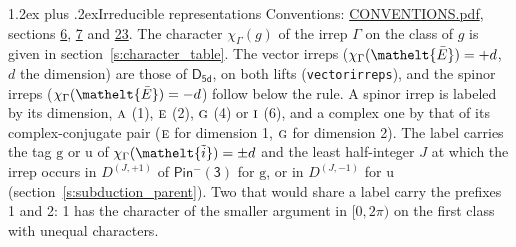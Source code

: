 \documentclass[10pt,a4paper]{article}
\makeatletter
\renewcommand\section{\@startsection{section}{1}{\z@}{-3ex plus -1ex minus -.2ex}%
  {1.2ex plus .2ex}{\normalfont\large\sffamily\bfseries\color{parttitle}}}
\numberwithin{equation}{section}
\newcommand{\eltfont}[1]{{\let\sigma\eltsigma\mathelt{#1}}}
\newcommand{\grp}[1]{\mathsf{#1}}
\newcommand{\irr}[1]{\text{\normalfont\scshape #1}}
\newcommand{\elt}[1]{\eltfont{#1}}
\newcommand{\ptag}[1]{\mathrm{#1}}
\newcommand{\irrJp}[2]{D^{(#1,#2)}}
\newcommand{\irchar}[1]{\chi_{#1}}
\newcommand{\barred}[1]{\bar{#1}}
\newcommand{\lift}[1]{\tilde{#1}}
\makeatother
\begin{document}
\section{Irreducible representations}\label{s:irreps}
Conventions: \href{../../CONVENTIONS.pdf}{CONVENTIONS.pdf}, sections \href{../../../rotation/CONVENTIONS.pdf\#conv.6}{6}, \href{../../../rotation/CONVENTIONS.pdf\#conv.7}{7} and \href{../../CONVENTIONS.pdf\#conv.23}{23}.
\leavevmode\label{n:function.character}\label{n:irrep.Gamma}The character $\irchar{\Gamma}(g)$ of the irrep $\Gamma$ on the class of $g$ is given in section~\ref{s:character_table}. \label{n:index.dimension}The vector irreps ($\irchar{\Gamma}(\elt{\barred{E}}) = +d$, $d$ the dimension) are those of \href{../../../rotation/data/pdf/D5d.pdf}{$\grp{D_{5d}}$}, on both lifts (\texttt{vectorirreps}), and the spinor irreps ($\irchar{\Gamma}(\elt{\barred{E}}) = -d$) follow below the rule. A spinor irrep is labeled by its dimension, $\irr{a}$ (1), $\irr{e}$ (2), $\irr{g}$ (4) or $\irr{i}$ (6), and a complex one by that of its complex-conjugate pair ($\irr{e}$ for dimension 1, $\irr{g}$ for dimension 2). The label carries the tag $\ptag{g}$ or $\ptag{u}$ of $\irchar{\Gamma}(\elt{\lift{i}}) = \pm d$ and the least half-integer $J$ at which the irrep occurs in $\irrJp{J}{+1}$ of $\grp{Pin^{-}(3)}$ for $\ptag{g}$, or in $\irrJp{J}{-1}$ for $\ptag{u}$ (section~\ref{s:subduction_parent}). Two that would share a label carry the prefixes 1 and 2: 1 has the character of the smaller argument in $[0, 2\pi)$ on the first class with unequal characters.
\end{document}
